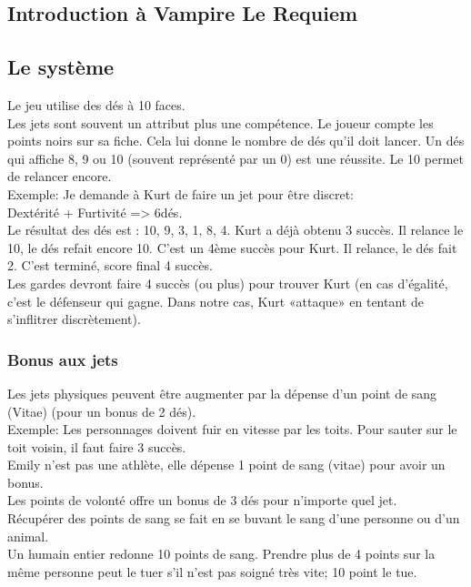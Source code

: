 \documentclass[oneside,12pt]{book}
\begin{document}
\begin{flushleft}
\chapter{Introduction à Vampire Le Requiem}
\section{Le système}

Le jeu utilise des dés à 10 faces. \\
Les jets sont souvent un attribut plus une compétence. Le joueur compte les points noirs sur sa fiche. Cela lui donne le nombre de dés qu'il doit lancer. Un dés qui affiche 8, 9 ou 10 (souvent représenté par un 0) est une réussite. Le 10 permet de relancer encore. \\
Exemple: Je demande à Kurt de faire un jet pour être discret:\\ Dextérité + Furtivité => 6dés.\\
\vspace{0.5cm}
Le résultat des dés est : 10, 9, 3, 1, 8, 4. Kurt a déjà obtenu 3 succès. Il relance le 10, le dés refait encore 10. C'est un 4ème succès pour Kurt. Il relance, le dés fait 2. C'est terminé, score final 4 succès. \\
Les gardes devront faire 4 succès (ou plus) pour trouver Kurt (en cas d'égalité, c'est le défenseur qui gagne. Dans notre cas, Kurt «attaque» en tentant de s'inflitrer discrètement).
\\
\subsection{Bonus aux jets}
Les jets physiques peuvent être augmenter par la dépense d'un point de sang (Vitae) (pour un bonus de 2 dés).\\
\vspace{0.5cm}
Exemple: Les personnages doivent fuir en vitesse par les toits. Pour sauter sur le toit voisin, il faut faire 3 succès.\\ Emily n'est pas une athlète, elle dépense 1 point de sang (vitae) pour avoir un bonus.
\\
Les points de volonté offre un bonus de 3 dés pour n'importe quel jet. \\
Récupérer des points de sang se fait en se buvant le sang d'une personne ou d'un animal.\\
Un humain entier redonne 10 points de sang.
Prendre plus de 4 points sur la même personne peut le tuer s'il n'est pas soigné très vite; 10 point le tue.\\


\end{flushleft}
\end{document}
